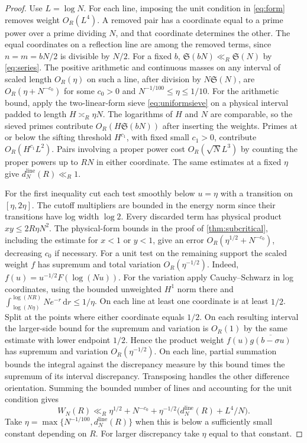 \documentclass[11pt,a4paper]{article}
\numberwithin{equation}{section}
\newcommand{\SSS}{\mathfrak S}
\newcommand{\ud}{\mathrm d}
\begin{document}
\begin{proof}
Use $L=\log N$. For each line, imposing the unit condition
in \cref{eq:form} removes weight $O_R(L^4)$. A removed pair
has a coordinate equal to a prime power over a prime dividing
$N$, and that coordinate determines the other. The equal
coordinates on a reflection line are among the removed
terms, since $n=m=bN/2$ is divisible by $N/2$.
For a fixed $b$, $\SSS(bN)\ll_R\SSS(N)$ by
\cref{eq:series}. The positive arithmetic and continuous
masses on any interval of scaled length $O_R(\eta)$
on such a line, after division by $N\SSS(N)$, are
$O_R(\eta+N^{-c_0})$ for some $c_0>0$ and
$N^{-1/100}\le\eta\le1/10$. For the arithmetic bound,
apply the two-linear-form sieve \eqref{eq:uniformsieve}
on a physical interval padded to length $H\asymp_R\eta N$.
The logarithms of $H$ and $N$ are comparable, so the
sieved primes contribute $O_R(H\SSS(bN))$ after inserting
the weights. Primes at or below the sifting threshold
$H^{c_1}$, with fixed small $c_1>0$, contribute
$O_R(H^{c_1}L^2)$. Pairs involving a proper power cost
$O_R(\sqrt N L^3)$ by counting the proper powers up to
$RN$ in either coordinate. The same estimates at a
fixed $\eta$ give $d_N^{\mathrm{line}}(R)\ll_R1$.

For the first inequality cut each test smoothly below
$u=\eta$ with a transition on $[\eta,2\eta]$.
The cutoff multipliers are bounded in the energy norm
since their transitions have log width $\log 2$.
Every discarded term has physical product $xy\le
2R\eta N^2$. The physical-form bounds in the proof of
\cref{thm:subcritical}, including the estimate for $x<1$
or $y<1$, give an error $O_R(\eta^{1/2}+N^{-c_0})$,
decreasing $c_0$ if necessary. For a unit test on the
remaining support the scaled weight $f$ has supremum
and total variation $O_R(\eta^{-1/2})$. Indeed,
$f(u)=u^{-1/2}F(\log(Nu))$. For the variation apply
Cauchy--Schwarz in log coordinates, using the bounded
unweighted $H^1$ norm there and
$\int_{\log(N\eta)}^{\log(NR)}N e^{-r}\,\ud r\le1/\eta$.
On each line at least one coordinate is at least $1/2$. Split
at the points where either coordinate equals $1/2$. On each
resulting interval the larger-side bound for the supremum and
variation is $O_R(1)$ by the same estimate with lower endpoint
$1/2$. Hence the product weight $f(u)\overline{g(b-\sigma u)}$
has supremum and variation $O_R(\eta^{-1/2})$.
On each line, partial summation bounds the integral
against the discrepancy measure by this bound times
the supremum of its interval discrepancy. Transposing
handles the other difference orientation. Summing the
bounded number of lines and accounting for the unit
condition gives
\[
 W_N(R)\ll_R\eta^{1/2}+N^{-c_0}
                 +\eta^{-1/2}\bigl(d_N^{\mathrm{line}}(R)+L^4/N\bigr).
\]
Take $\eta=\max\{N^{-1/100},d_N^{\mathrm{line}}(R)\}$
when this is below a sufficiently small constant depending on $R$.
For larger discrepancy take $\eta$ equal to that constant.


\end{proof}
\end{document}
